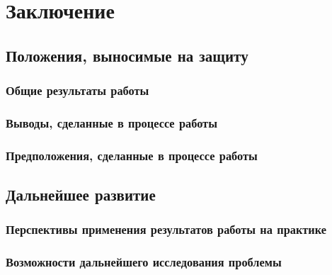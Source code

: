 \chapter{Заключение}
\section{Положения, выносимые на защиту}
\subsection{Общие результаты работы}
\subsection{Выводы, сделанные в процессе работы}
\subsection{Предположения, сделанные в процессе работы}
\section{Дальнейшее развитие}
\subsection[Перспективы применения результатов работы \\на практике]{Перспективы применения результатов работы на практике}
\subsection{Возможности дальнейшего исследования проблемы}